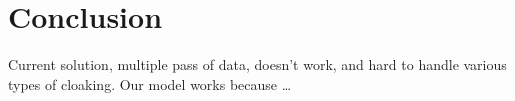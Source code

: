 \section{Conclusion}
\label{s:conclusion}

Current solution, multiple pass of data, doesn’t work, and hard to
handle various types of cloaking.
Our model works because …



